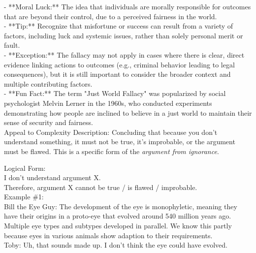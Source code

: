 \documentclass[a4paper,12pt,single,pdftex]{scrartcl}
\begin{document}
    
        - **Moral Luck:** The idea that individuals are morally responsible for outcomes that are beyond their control, due to a perceived fairness in the world.
    \\

    
      - **Tip:** Recognize that misfortune or success can result from a variety of factors, including luck and systemic issues, rather than solely personal merit or fault.
    \\

    
      - **Exception:** The fallacy may not apply in cases where there is clear, direct evidence linking actions to outcomes (e.g., criminal behavior leading to legal consequences), but it is still important to consider the broader context and multiple contributing factors.
    \\

    
      - **Fun Fact:** The term "Just World Fallacy" was popularized by social psychologist Melvin Lerner in the 1960s, who conducted experiments demonstrating how people are inclined to believe in a just world to maintain their sense of security and fairness.
    \\

  

Appeal to Complexity
    Description: Concluding that because you don't understand something, it must not be true, it's improbable, or the argument must be flawed. This is a specific form of the {\it argument from ignorance}.

    
      Logical Form:
    \\

    
      I don't understand argument X.
    \\

    
      Therefore, argument X cannot be true / is flawed / improbable.
    \\

    
      Example \#1:
    \\

    
      Bill the Eye Guy: The development of the eye is monophyletic, meaning they have their origins in a proto-eye that evolved around 540 million years ago. Multiple eye types and subtypes developed in parallel. We know this partly because eyes in various animals show adaption to their requirements.
    \\

    
      Toby: Uh, that sounds made up. I don't think the eye could have evolved.
    \\
\end{document}
